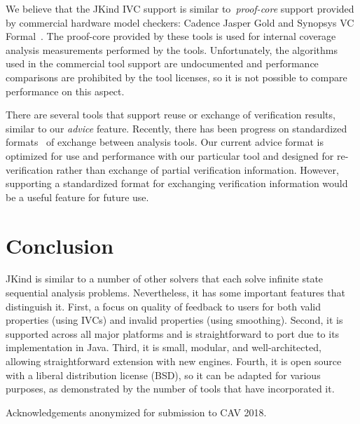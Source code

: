 \documentclass{llncs}
\newcommand{\jkind}{{\sc JKind}\xspace}
\newcommand{\lustre}{{\sc Lustre}\xspace}
\renewcommand{\paragraph}[1]{\vspace{5pt}\noindent {\bf #1}}
\begin{document}
We believe that the \jkind IVC support is similar to~\emph{proof-core} support provided by commercial hardware model checkers: Cadence Jasper Gold and Synopsys VC Formal~\cite{hanna2015formal, jasper_gold, Synopsys_VC_formal}.  The proof-core provided by these tools is used for internal coverage analysis measurements performed by the tools.  Unfortunately, the algorithms used in the commercial tool support are undocumented and performance comparisons are prohibited by the tool licenses, so it is not possible to compare performance on this aspect.

There are several tools that support reuse or exchange of verification results, similar to our {\em advice} feature.  Recently, there has been progress on standardized formats~\cite{Beyer:2016} of exchange between analysis tools.  Our current advice format is optimized for use and performance with our particular tool and designed for re-verification rather than exchange of partial verification information.  However, supporting a standardized format for exchanging verification information would be a useful feature for future use.



\section{Conclusion}
\jkind is similar to a number of other solvers that each solve
infinite state sequential analysis problems. Nevertheless, it has some
important features that distinguish it. First, a focus on quality of
feedback to users for both valid properties (using IVCs) and invalid
properties (using smoothing). Second, it is supported across all major platforms and is
straightforward to port due to its implementation in Java. Third, it
is small, modular, and well-architected, allowing straightforward
extension with new engines. Fourth, it is open source with a liberal
distribution license (BSD), so it can be adapted for various purposes,
as demonstrated by the number of tools that have incorporated it.



\paragraph{Acknowledgments}

Acknowledgements anonymized for submission to CAV 2018.


{}

\end{document}

